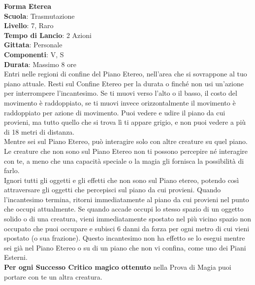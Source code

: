 \begin{multicols}{2}
\medskip\textbf{Forma Eterea}\\
\textbf{Scuola}: Trasmutazione\\
\textbf{Livello}: 7, Raro\\
\textbf{Tempo di Lancio}: 2 Azioni\\
\textbf{Gittata}: Personale\\
\textbf{Componenti}: V, S\\
\textbf{Durata}: Massimo 8 ore\\
Entri nelle regioni di confine del Piano Etereo, nell'area che si sovrappone al tuo piano attuale. Resti sul Confine Etereo per la durata o finché non usi un'azione per interrompere l'incantesimo. Se ti muovi verso l'alto o il basso, il costo del movimento è raddoppiato, se ti muovi invece orizzontalmente il movimento è raddoppiato per azione di movimento. Puoi vedere e udire il piano da cui provieni, ma tutto quello che si trova lì ti appare grigio, e non puoi vedere a più di 18 metri di distanza.\\
Mentre sei sul Piano Etereo, può interagire solo con altre creature su quel piano. Le creature che non sono sul Piano Etereo non ti possono percepire né interagire con te, a meno che una capacità speciale o la magia gli fornisca la possibilità di farlo.\\
Ignori tutti gli oggetti e gli effetti che non sono sul Piano etereo, potendo così attraversare gli oggetti che percepisci sul piano da cui provieni. Quando l'incantesimo termina, ritorni immediatamente al piano da cui provieni nel punto che occupi attualmente. Se quando accade occupi lo stesso spazio di un oggetto solido o di una creatura, vieni immediatamente spostato nel più vicino spazio non occupato che puoi occupare e subisci 6 danni da forza per ogni metro di cui vieni spostato (o sua frazione). Questo incantesimo non ha effetto se lo esegui mentre sei già nel Piano Etereo o su di un piano che non vi confina, come uno dei Piani Esterni.\\
\textbf{Per ogni Successo Critico magico ottenuto} nella Prova di Magia puoi portare con te un altra creatura.


\end{multicols}
